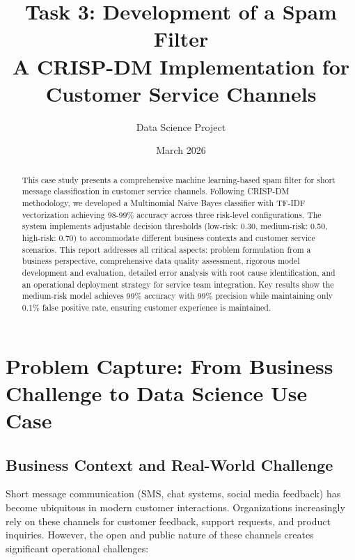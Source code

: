 \documentclass[12pt,a4paper]{article}
\title{\textbf{Task 3: Development of a Spam Filter}\\
       \large A CRISP-DM Implementation for Customer Service Channels}
\author{Data Science Project}
\date{March 2026}
\begin{document}
\maketitle

\begin{abstract}
This case study presents a comprehensive machine learning-based spam filter for short message classification in customer service channels. Following CRISP-DM methodology, we developed a Multinomial Naive Bayes classifier with TF-IDF vectorization achieving 98-99\% accuracy across three risk-level configurations. The system implements adjustable decision thresholds (low-risk: 0.30, medium-risk: 0.50, high-risk: 0.70) to accommodate different business contexts and customer service scenarios. This report addresses all critical aspects: problem formulation from a business perspective, comprehensive data quality assessment, rigorous model development and evaluation, detailed error analysis with root cause identification, and an operational deployment strategy for service team integration. Key results show the medium-risk model achieves 99\% accuracy with 99\% precision while maintaining only 0.1\% false positive rate, ensuring customer experience is maintained.
\end{abstract}

\newpage
\tableofcontents
\newpage


\section{Problem Capture: From Business Challenge to Data Science Use Case}

\subsection{Business Context and Real-World Challenge}

Short message communication (SMS, chat systems, social media feedback) has become ubiquitous in modern customer interactions. Organizations increasingly rely on these channels for customer feedback, support requests, and product inquiries. However, the open and public nature of these channels creates significant operational challenges:
\end{document}
